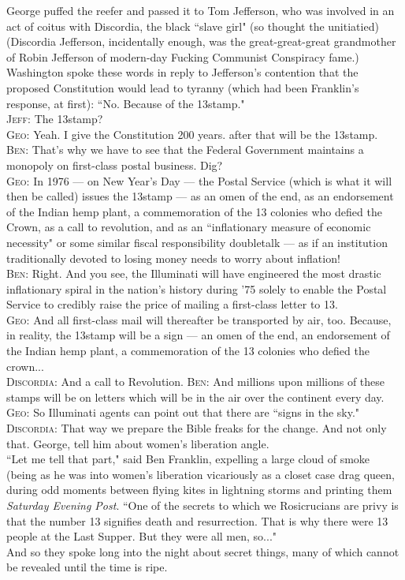 \documentclass[12pt, onecolumn, letterpaper, oneside]{book}
\begin{document}
George puffed the reefer and passed it to Tom Jefferson, who was involved in an act of coitus with Discordia, the black ``slave girl" (so thought the unitiatied) (Discordia Jefferson, incidentally enough, was the great-great-great grandmother of Robin Jefferson of modern-day Fucking Communist Conspiracy fame.)\\
Washington spoke these words in reply to Jefferson's contention that the proposed Constitution would lead to tyranny (which had been Franklin's response, at first): ``No. Because of the 13\cent stamp."\\
\textsc{Jeff:} The 13\cent stamp?\\
\textsc{Geo:} Yeah. I give the Constitution 200 years. after that will be the 13\cent stamp.\\
\textsc{Ben:} That's why we have to see that the Federal Government maintains a monopoly on first-class postal business. Dig?\\
\textsc{Geo:} In 1976 --- on New Year's Day --- the Postal Service (which is what it will then be called) issues the 13\cent stamp --- as an omen of the end, as an endorsement of the Indian hemp plant, a commemoration of the 13 colonies who defied the Crown, as a call to revolution, and as an ``inflationary measure of economic necessity" or some similar fiscal responsibility doubletalk --- as if an institution traditionally devoted to losing money needs to worry about inflation!\\
\textsc{Ben:} Right. And you see, the Illuminati will have engineered the most drastic inflationary spiral in the nation's history during '75 solely to enable the Postal Service to credibly raise the price of mailing a first-class letter to 13\cent.\\
\textsc{Geo:} And all first-class mail will thereafter be transported by air, too. Because, in reality, the 13\cent stamp will be a sign --- an omen of the end, an endorsement of the Indian hemp plant, a commemoration of the 13 colonies who defied the crown...\\
\textsc{Discordia:} And a call to Revolution.
\textsc{Ben:} And millions upon millions of these stamps will be on letters which will be in the air over the continent every day.\\
\textsc{Geo:} So Illuminati agents can point out that there are ``signs in the sky."\\
\textsc{Discordia:} That way we prepare the Bible freaks for the change. And not only that. George, tell him about women's liberation angle.\\
``Let me tell that part," said Ben Franklin, expelling a large cloud of smoke (being as he was into women's liberation vicariously as a closet case drag queen, during odd moments between flying kites in lightning storms and printing them \emph{Saturday Evening Post}. ``One of the secrets to which we Rosicrucians are privy is that the number 13 signifies death and resurrection. That is why there were 13 people at the Last Supper. But they were all men, so..."\\
And so they spoke long into the night about secret things, many of which cannot be revealed until the time is ripe.
\end{document}
